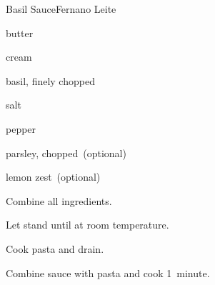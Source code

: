 \begin{recipe}{Basil Sauce}{Fernano Leite}{}

\begin{ingredients}
\item \lbs{\quarter} butter
\item \C{\half} 
\item {} cream
\item basil, finely chopped
\item salt
\item pepper
\item parsley, chopped~(optional)
\item lemon zest~(optional)
\end{ingredients}

\begin{directions}
\item Combine all ingredients.
\item Let stand until at room temperature.
\item Cook pasta and drain.
\item Combine sauce with pasta and cook 1~minute.
\end{directions}

\end{recipe}
